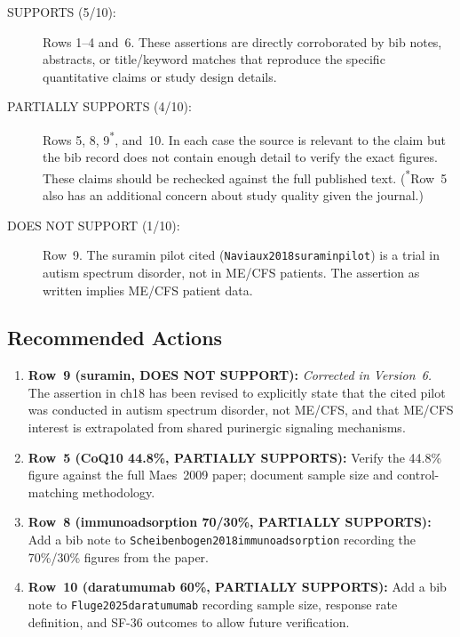 \begin{description}
  \item[SUPPORTS (5/10):] Rows 1--4 and~6.  These assertions are directly
    corroborated by bib notes, abstracts, or title/keyword matches that
    reproduce the specific quantitative claims or study design details.
  \item[PARTIALLY SUPPORTS (4/10):] Rows 5, 8, 9\textsuperscript{*}, and~10.
    In each case the source is relevant to the claim but the bib record does
    not contain enough detail to verify the exact figures.  These claims
    should be rechecked against the full published text.
    (\textsuperscript{*}Row~5 also has an additional concern about study
    quality given the journal.)
  \item[DOES NOT SUPPORT (1/10):] Row~9.  The suramin pilot cited
    (\texttt{Naviaux2018suraminpilot}) is a trial in autism spectrum
    disorder, not in ME/CFS patients.  The assertion as written implies
    ME/CFS patient data.
\end{description}

\subsection*{Recommended Actions}

\begin{enumerate}
  \item \textbf{Row~9 (suramin, DOES NOT SUPPORT):} \textit{Corrected in
    Version~6.}  The assertion in ch18 has been revised to explicitly state
    that the cited pilot was conducted in autism spectrum disorder, not
    ME/CFS, and that ME/CFS interest is extrapolated from shared
    purinergic signaling mechanisms.

  \item \textbf{Row~5 (CoQ10 44.8\%, PARTIALLY SUPPORTS):} Verify the
    44.8\% figure against the full Maes~2009 paper; document sample size
    and control-matching methodology.

  \item \textbf{Row~8 (immunoadsorption 70/30\%, PARTIALLY SUPPORTS):}
    Add a bib note to \texttt{Scheibenbogen2018immunoadsorption} recording
    the 70\%/30\% figures from the paper.

  \item \textbf{Row~10 (daratumumab 60\%, PARTIALLY SUPPORTS):} Add a bib
    note to \texttt{Fluge2025daratumumab} recording sample size, response
    rate definition, and SF-36 outcomes to allow future verification.
\end{enumerate}

